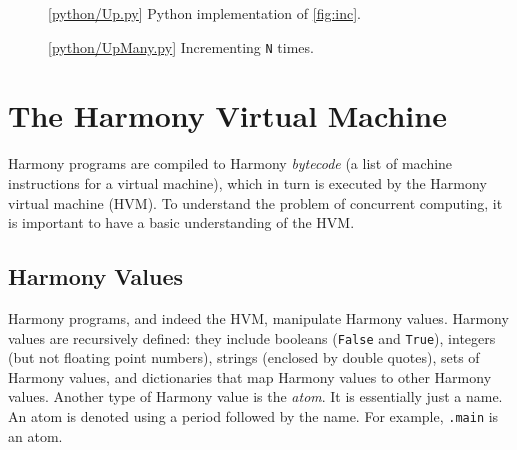 \documentclass{report}
\newcommand{\harmonylink}[1]{%
[\href{https://www.cs.cornell.edu/home/rvr/harmony/#1}{\underline{#1}}]%
}
\newenvironment{code}{
\tcolorbox
}{
\endtcolorbox
}
\begin{document}
\begin{figure}
\begin{code}
\end{code}
\caption{\harmonylink{python/Up.py} Python implementation of \autoref{fig:inc}.}
\label{fig:incpy}
\end{figure}

\begin{figure}
\begin{code}
\end{code}
\caption{\harmonylink{python/UpMany.py} Incrementing \texttt{N} times.}
\label{fig:incmany}
\end{figure}

\chapter{The Harmony Virtual Machine}
\label{ch:harmonymachine}
%

Harmony programs are compiled to Harmony \emph{bytecode}
%
(a list of machine instructions for a virtual machine),
which in turn is executed by the Harmony virtual machine (HVM).
%
%
%
To understand the problem of concurrent computing, it
is important to have a basic understanding of the HVM.

\section*{Harmony Values}
\label{ap:harmonyvalues}

Harmony programs, and indeed the HVM,  manipulate Harmony values.
Harmony values are recursively defined:
they include booleans (\texttt{False} and \texttt{True}),
integers (but not floating point numbers),
strings (enclosed by double quotes),
sets of Harmony values,
and dictionaries
%
that map Harmony values to other Harmony values.
%
Another type of Harmony value is the \emph{atom}.
%
It is essentially
just a name.  An atom is denoted using a period followed by the
name.  For example, \texttt{.main} is an atom.
\end{document}
